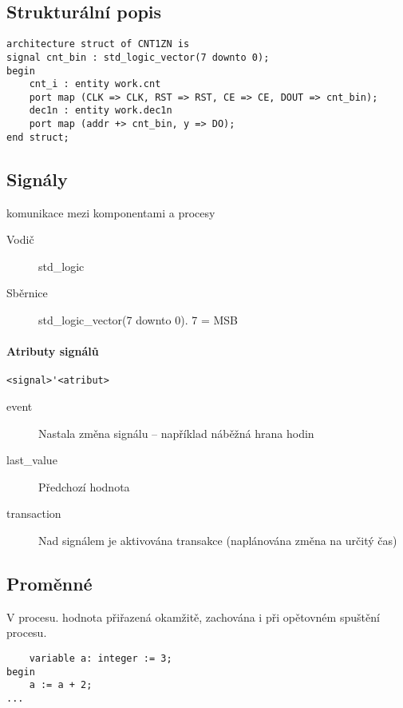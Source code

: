 \documentclass[a4paper, 11pt]{report}
\begin{document}
\subsection{Strukturální popis}

\begin{lstlisting}
architecture struct of CNT1ZN is
signal cnt_bin : std_logic_vector(7 downto 0);
begin
	cnt_i : entity work.cnt
	port map (CLK => CLK, RST => RST, CE => CE, DOUT => cnt_bin);
	dec1n : entity work.dec1n
	port map (addr +> cnt_bin, y => DO);
end struct;
\end{lstlisting}

\subsection{Signály}

komunikace mezi komponentami a procesy

\begin{description}
	\item[Vodič] std\_logic
	\item[Sběrnice] std\_logic\_vector(7 downto 0). 7 = MSB
\end{description}

\paragraph{Atributy signálů}

\verb|<signal>'<atribut>|

\begin{description}
	\item[event] Nastala změna signálu -- například náběžná hrana hodin
	\item[last\_value] Předchozí hodnota
	\item[transaction] Nad signálem je aktivována transakce (naplánována změna na určitý čas)
\end{description}

\subsection{Proměnné}

V procesu. hodnota přiřazená okamžitě, zachována i při opětovném spuštění procesu.

\begin{lstlisting}
	variable a: integer := 3;
begin
	a := a + 2;
...
\end{lstlisting}
\end{document}
